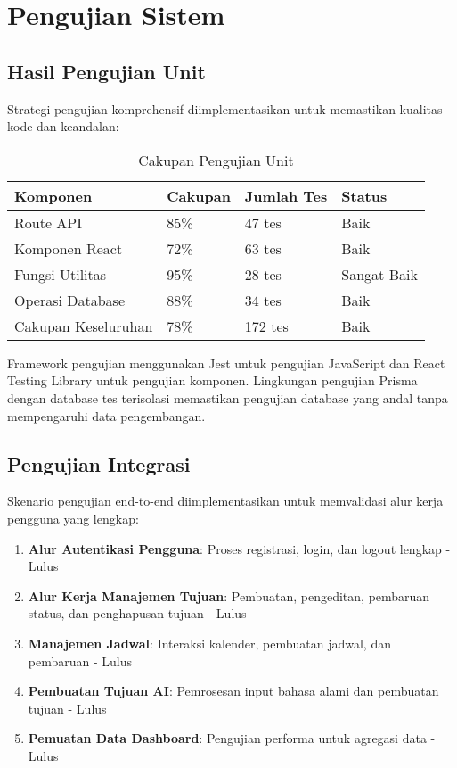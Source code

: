 \section{Pengujian Sistem}

\subsection{Hasil Pengujian Unit}

Strategi pengujian komprehensif diimplementasikan untuk memastikan kualitas kode dan keandalan:

\begin{table}[ht]
\centering
\caption{Cakupan Pengujian Unit}
\label{tab:testing-coverage}
\footnotesize
\begin{adjustbox}{width=\textwidth,center}
\begin{tabular}{@{}p{4cm}p{3cm}p{3cm}p{3cm}@{}}
\toprule
\textbf{Komponen} & \textbf{Cakupan} & \textbf{Jumlah Tes} & \textbf{Status} \\
\midrule
Route API & 85\% & 47 tes & Baik \\
\hline
Komponen React & 72\% & 63 tes & Baik \\
\hline
Fungsi Utilitas & 95\% & 28 tes & Sangat Baik \\
\hline
Operasi Database & 88\% & 34 tes & Baik \\
\hline
Cakupan Keseluruhan & 78\% & 172 tes & Baik \\
\bottomrule
\end{tabular}
\end{adjustbox}
\end{table}

Framework pengujian menggunakan Jest untuk pengujian JavaScript dan React Testing Library untuk pengujian komponen. Lingkungan pengujian Prisma dengan database tes terisolasi memastikan pengujian database yang andal tanpa mempengaruhi data pengembangan.

\subsection{Pengujian Integrasi}

Skenario pengujian end-to-end diimplementasikan untuk memvalidasi alur kerja pengguna yang lengkap:

\begin{enumerate}
\item \textbf{Alur Autentikasi Pengguna}: Proses registrasi, login, dan logout lengkap - Lulus
\item \textbf{Alur Kerja Manajemen Tujuan}: Pembuatan, pengeditan, pembaruan status, dan penghapusan tujuan - Lulus
\item \textbf{Manajemen Jadwal}: Interaksi kalender, pembuatan jadwal, dan pembaruan - Lulus
\item \textbf{Pembuatan Tujuan AI}: Pemrosesan input bahasa alami dan pembuatan tujuan - Lulus
\item \textbf{Pemuatan Data Dashboard}: Pengujian performa untuk agregasi data - Lulus
\end{enumerate}

